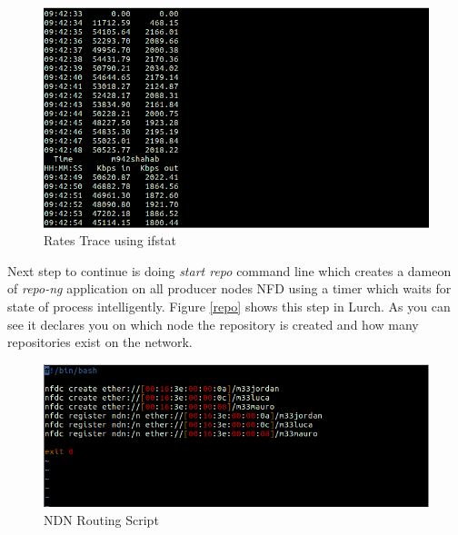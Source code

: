 \begin{figure}[H]

\begin{center}

\includegraphics[scale = 0.35]{Pictures/data.png}

\caption{Rates Trace using ifstat} \label{data} 

\end{center}

\end{figure}
 
 
 
Next step to continue is doing \textit{start repo} command line which creates a dameon of \textit{repo-ng} application on all producer nodes NFD using a timer which waits for state of process intelligently. Figure \ref{repo} shows this step in Lurch. As you can see it declares you on which node the repository is created and how many repositories exist on the network.



\begin{figure}[H]

\begin{center}

\includegraphics[scale = 0.35]{Pictures/script.png}

\caption{NDN Routing Script} \label{script} 

\end{center}

\end{figure}


